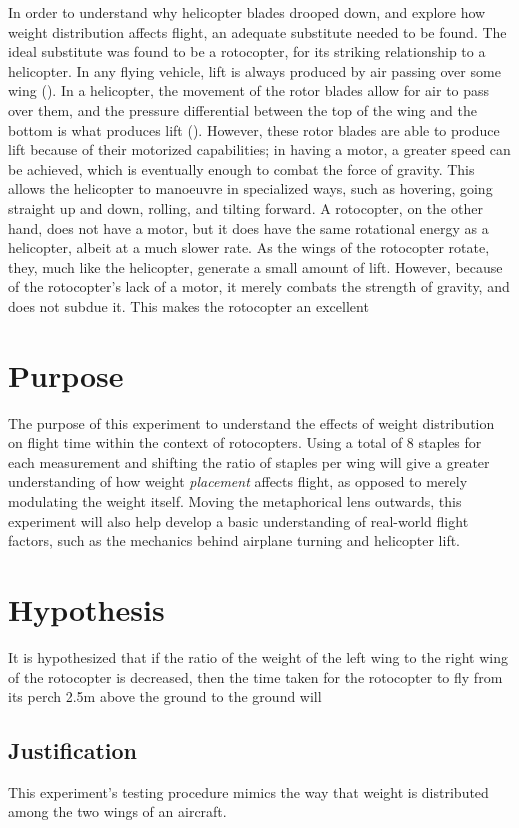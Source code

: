 \documentclass[]{article}
\begin{document}
In order to understand why helicopter blades drooped down, and explore how weight distribution affects flight, an adequate substitute needed to be found. The ideal substitute was found to be a rotocopter, for its striking relationship to a helicopter. In any flying vehicle, lift is always produced by air passing over some wing (). In a helicopter, the movement of the rotor blades allow for air to pass over them, and the pressure differential between the top of the wing and the bottom is what produces lift (). However, these rotor blades are able to produce lift because of their motorized capabilities; in having a motor, a greater speed can be achieved, which is eventually enough to combat the force of gravity. This allows the helicopter to manoeuvre in specialized ways, such as hovering, going straight up and down, rolling, and tilting forward. A rotocopter, on the other hand, does not have a motor, but it does have the same rotational energy as a helicopter, albeit at a much slower rate. As the wings of the rotocopter rotate, they, much like the helicopter, generate a small amount of lift. However, because of the rotocopter's lack of a motor, it merely combats the strength of gravity, and does not subdue it. This makes the rotocopter an excellent 

\section{Purpose}
The purpose of this experiment to understand the effects of weight distribution on flight time within the context of rotocopters. Using a total of 8 staples for each measurement and shifting the ratio of staples per wing will give a greater understanding of how weight \textit{placement} affects flight, as opposed to merely modulating the weight itself. Moving the metaphorical lens outwards, this experiment will also help develop a basic understanding of real-world flight factors, such as the mechanics behind airplane turning and helicopter lift.

\section{Hypothesis}
It is hypothesized that if the ratio of the weight of the left wing to the right wing of the rotocopter is decreased, then the time taken for the rotocopter to fly from its perch 2.5m above the ground to the ground will 

\subsection{Justification}
This experiment's testing procedure mimics the way that weight is distributed among the two wings of an aircraft.
\end{document}
